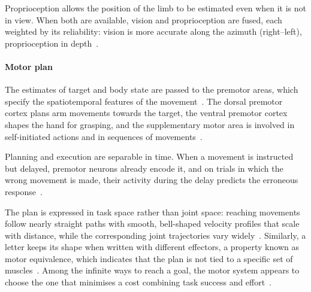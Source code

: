 \documentclass[12pt]{report}
\begin{document}
Proprioception allows the position of the limb to be estimated even when it is not in view. When both are available, vision and proprioception are fused, each weighted by its reliability: vision is more accurate along the azimuth (right--left), proprioception in depth~\cite[p.~720]{wolpert2021}.


\paragraph{Motor plan}
The estimates of target and body state are passed to the premotor areas, which specify the spatiotemporal features of the movement~\cite[p.~710]{kandel2021}. The dorsal premotor cortex plans arm movements towards the target, the ventral premotor cortex shapes the hand for grasping, and the supplementary motor area is involved in self-initiated actions and in sequences of movements~\cite[pp.~829--831, 857]{scott2021}.

Planning and execution are separable in time. When a movement is instructed but delayed, premotor neurons already encode it, and on trials in which the wrong movement is made, their activity during the delay predicts the erroneous response~\cite[p.~821]{scott2021}.

The plan is expressed in task space rather than joint space: reaching movements follow nearly straight paths with smooth, bell-shaped velocity profiles that scale with distance, while the corresponding joint trajectories vary widely~\cite[pp.~725--726]{wolpert2021}. Similarly, a letter keeps its shape when written with different effectors, a property known as motor equivalence, which indicates that the plan is not tied to a specific set of muscles~\cite[pp.~726--727]{wolpert2021}. Among the infinite ways to reach a goal, the motor system appears to choose the one that minimises a cost combining task success and effort~\cite[p.~727]{wolpert2021}.
\end{document}
